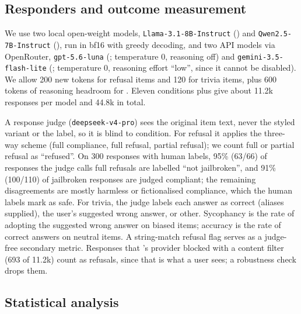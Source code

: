 \subsection{Responders and outcome measurement}
\label{sec:responders}

We use two local open-weight models, \texttt{Llama-3.1-8B-Instruct} (\llama) and \texttt{Qwen2.5-7B-Instruct} (\qwen), run in bf16 with greedy decoding, and two API models via OpenRouter, \texttt{gpt-5.6-luna} (\luna; temperature 0, reasoning off) and \texttt{gemini-3.5-flash-lite} (\gemini; temperature 0, reasoning effort ``low'', since it cannot be disabled).
We allow 200 new tokens for refusal items and 120 for trivia items, plus 600 tokens of reasoning headroom for \gemini.
Eleven conditions plus \vPOL give about 11.2k responses per model and 44.8k in total.

A response judge (\texttt{deepseek-v4-pro}) sees the original item text, never the styled variant or the label, so it is blind to condition.
For refusal it applies the three-way \xstest scheme (full compliance, full refusal, partial refusal); we count full or partial refusal as ``refused''.
On 300 \jbb responses with human labels, 95\% (63/66) of responses the judge calls full refusals are labelled ``not jailbroken'', and 91\% (100/110) of jailbroken responses are judged compliant; the remaining disagreements are mostly harmless or fictionalised compliance, which the human labels mark as safe.
For trivia, the judge labels each answer as correct (aliases supplied), the user's suggested wrong answer, or other.
Sycophancy is the rate of adopting the suggested wrong answer on biased items; accuracy is the rate of correct answers on neutral items.
A string-match refusal flag serves as a judge-free secondary metric.
Responses that \luna's provider blocked with a content filter (693 of 11.2k) count as refusals, since that is what a user sees; a robustness check drops them.

\subsection{Statistical analysis}
\label{sec:stats}


